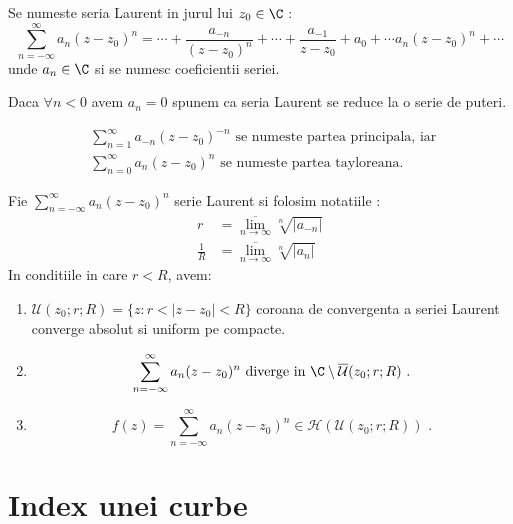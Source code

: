 \begin{definition}
    Se numeste seria Laurent in jurul lui $z_0 \in \C$ :
    \begin{equation*}
        \sum_{n=-\infty}^{\infty} a_n(z-z_0)^n =
            \cdots + \frac{a_{-n}}{(z-z_0)^n} + \cdots + \frac{a_{-1}}{z-z_0} + a_0 + \cdots a_n(z-z_0)^n + \cdots
    \end{equation*}
    unde $a_n \in \C$ si se numesc coeficientii seriei.

    Daca $\forall n < 0$ avem $a_n = 0$ spunem ca seria Laurent se reduce la o serie de puteri.

    \begin{align*}
        &\sum_{n=1}^{\infty} a_{-n}(z-z_0)^{-n} \text { se numeste partea principala, iar } \\
        &\sum_{n=0}^{\infty} a_n(z-z_0)^n \text { se numeste partea tayloreana}.
    \end{align*}
\end{definition}

\begin{theorem}
    Fie $\displaystyle \sum_{n=-\infty}^{\infty} a_n(z-z_0)^n$ serie Laurent si folosim notatiile :
    \begin{align*}
        r &= \overline{\lim_{n \to \infty}} \sqrt[n]{|a_{-n}|} \\
        \frac{1}{R} &=\overline{\lim_{n \to \infty}} \sqrt[n]{|a_n|}
    \end{align*}
    In conditiile in care $r<R$, avem:
    \begin{enumerate}
        \item $\mathcal{U}(z_0;r;R) = \{z \colon r < |z-z_0| < R\}$
            coroana de convergenta a seriei Laurent converge absolut si uniform pe compacte.
        \item
            \[
                \sum_{n=-\infty}^{\infty} a_n(z-z_0)^n \text{ diverge in }
                    \C \setminus \overline{\mathcal{U}}(z_0;r;R) \text{ .}
            \]
        \item
            \[
                f(z) = \sum_{n=-\infty}^{\infty} a_n(z-z_0)^n \in \mathcal{H}(\mathcal{U}(z_0;r;R)) \text{ .}
            \]
    \end{enumerate}
\end{theorem}

\section{Index unei curbe}

